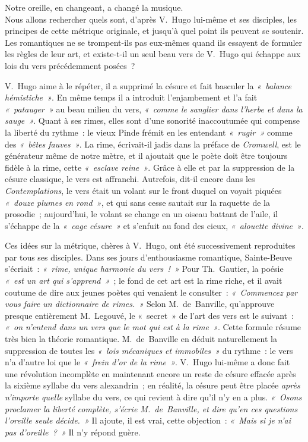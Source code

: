 \documentclass[french,twoside]{book} %
\begin{document}
Notre oreille, en changeant, a changé la musique.\\

\noindent Nous allons rechercher quels sont, d’après V. Hugo lui-même et ses disciples, les principes de cette métrique originale, et jusqu’à quel point ils peuvent se soutenir. Les romantiques ne se trompent-ils pas eux-mêmes quand ils essayent de formuler les règles de leur art, et existe-t-il un seul beau vers de V. Hugo qui échappe aux lois du vers précédemment posées ?\par
V. Hugo aime à le répéter, il a supprimé la césure et fait basculer la \emph{« balance hémistiche »}. En même temps il a introduit l’enjambement et l’a fait \emph{« patauger »} au beau milieu du vers, \emph{« comme le sanglier dans l’herbe et dans la sauge »}. Quant à ses rimes, elles sont d’une sonorité inaccoutumée qui compense la liberté du rythme : le vieux Pinde frémit en les entendant \emph{« rugir »} comme des \emph{« bêtes fauves »}. La rime, écrivait-il jadis dans la préface de \emph{Cromwell}, est le générateur même de notre mètre, et il ajoutait que le poète doit être toujours fidèle à la rime, cette \emph{« esclave reine »}. Grâce à elle et par la suppression de la césure classique, le vers est affranchi. Autrefois, dit-il encore dans les \emph{Contemplations}, le vers était un volant sur le front duquel on voyait piquées \emph{« douze plumes en rond »}, et qui sans cesse sautait sur la raquette de la prosodie ; aujourd’hui, le volant se change en un oiseau battant de l’aile, il s’échappe de la \emph{« cage césure »} et s’enfuit au fond des cieux, \emph{« alouette divine »}.\par
 Ces idées sur la métrique, chères à V. Hugo, ont été successivement reproduites par tous ses disciples. Dans ses jours d’enthousiasme romantique, Sainte-Beuve s’écriait : \emph{« rime, unique harmonie du vers ! »} Pour Th. Gautier, la poésie \emph{« est un art qui s’apprend »} ; le fond de cet art est la rime riche, et il avait coutume de dire aux jeunes poètes qui venaient le consulter : \emph{« Commencez par vous faire un dictionnaire de rimes. »} Selon M. de Banville, qu’approuve presque entièrement M. Legouvé, le « secret » de l’art des vers est le suivant : \emph{« on n’entend dans un vers que le mot qui est à la rime »}. Cette formule résume très bien la théorie romantique. M. de Banville en déduit naturellement la suppression de toutes les \emph{« lois mécaniques et immobiles »} du rythme : le vers n’a d’autre loi que le \emph{« frein d’or de la rime »}. V. Hugo lui-même a donc fait une révolution incomplète en maintenant encore un reste de césure effacée après la sixième syllabe du vers alexandrin ; en réalité, la césure peut être placée \emph{après n’importe quelle} syllabe du vers, ce qui revient à dire qu’il n’y en a plus. \emph{« Osons proclamer la liberté complète, s’écrie M. de Banville, et dire qu’en ces questions l’oreille seule décide. »} Il ajoute, il est vrai, cette objection : \emph{« Mais si je n’ai pas d’oreille ? »} Il n’y répond guère.\par
\end{document}
